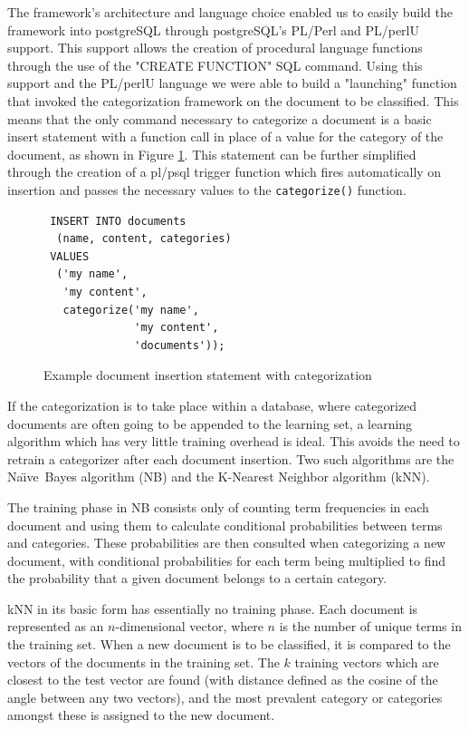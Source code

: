 \documentclass{article}
\newcommand{\naive}{Na\"\i ve}
\newcommand{\method}[1]{\texttt{#1()}}
\begin{document}
The framework's architecture and language choice enabled us to easily build the 
framework into postgreSQL through postgreSQL's PL/Perl and PL/perlU support. 
This support allows the creation of procedural language functions through the use of 
the "CREATE FUNCTION" SQL command. Using this support and the PL/perlU language 
we were able to build a "launching" function that invoked the categorization 
framework on the document to be classified. This means that the only command 
necessary to categorize a document is a basic insert statement with a function call in 
place of a value for the category of the document, as shown in Figure \ref{sql-insert}.
This statement can be further simplified through the creation of a pl/psql 
trigger function which fires automatically on insertion and passes the necessary values 
to the \method{categorize} function.

\begin{figure}
\begin{verbatim}
 INSERT INTO documents
  (name, content, categories) 
 VALUES
  ('my name',
   'my content',
   categorize('my name',
              'my content',
              'documents'));
\end{verbatim}
\caption{Example document insertion statement with categorization}
\label{sql-insert}
\end{figure}

If the categorization is to take place within a database, where
categorized documents are often going to be appended to the learning
set, a learning algorithm which has very little training overhead is
ideal.  This avoids the need to retrain a categorizer after each
document insertion.  Two such algorithms are the \naive\ Bayes
algorithm (NB) and the K-Nearest Neighbor algorithm (kNN).

The training phase in NB consists only of counting term frequencies in
each document and using them to calculate conditional probabilities
between terms and categories.  These probabilities are then consulted
when categorizing a new document, with conditional probabilities for
each term being multiplied to find the probability that a given
document belongs to a certain category.

kNN in its basic form has essentially no training phase.  Each
document is represented as an $n$-dimensional vector, where $n$ is the
number of unique terms in the training set.  When a new document is to
be classified, it is compared to the vectors of the documents in the
training set. The $k$ training vectors which are closest to the test
vector are found (with distance defined as the cosine of the angle
between any two vectors), and the most prevalent category or
categories amongst these is assigned to the new document.
\end{document}

